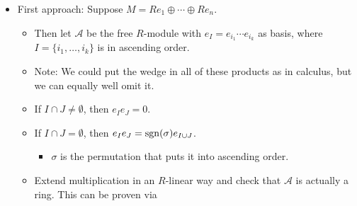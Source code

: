\documentclass[../notes.tex]{subfiles}
\begin{document}
\begin{itemize}
    \item First approach: Suppose $M=Re_1\oplus\cdots\oplus Re_n$.
    \begin{itemize}
        \item Then let $\mathcal{A}$ be the free $R$-module with $e_I=e_{i_1}\cdots e_{i_k}$ as basis, where $I=\{i_1,\dots,i_k\}$ is in ascending order.
        \item Note: We could put the wedge in all of these products as in calculus, but we can equally well omit it.
        \item If $I\cap J\neq\emptyset$, then $e_Ie_J=0$.
        \item If $I\cap J=\emptyset$, then $e_Ie_J=\operatorname{sgn}(\sigma)e_{I\cup J}$.
        \begin{itemize}
            \item $\sigma$ is the permutation that puts it into ascending order.
        \end{itemize}
        \item Extend multiplication in an $R$-linear way and check that $\mathcal{A}$ is actually a ring. This can be proven via
        \begin{figure}[h!]
            \centering
            

\end{figure}
\end{itemize}
\end{itemize}
\end{document}
